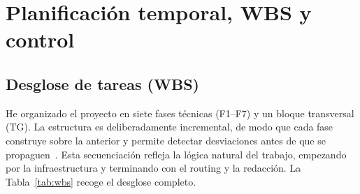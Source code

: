 \documentclass[11pt,a4paper]{article}
\begin{document}
\section{Planificación temporal, WBS y control}
\label{sec:planificacion-wbs-control}

\subsection{Desglose de tareas (WBS)}

He organizado el proyecto en siete fases técnicas (F1--F7) y un bloque transversal (TG). La estructura es deliberadamente incremental, de modo que cada fase construye sobre la anterior y permite detectar desviaciones antes de que se propaguen~\cite{gpi}. Esta secuenciación refleja la lógica natural del trabajo, empezando por la infraestructura y terminando con el routing y la redacción. La Tabla~\ref{tab:wbs} recoge el desglose completo.
\end{document}

